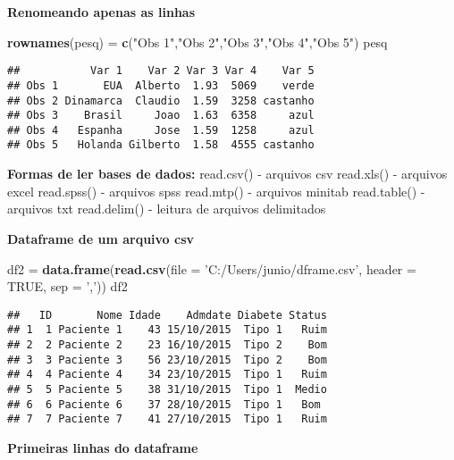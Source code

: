 \documentclass[]{article}
\newenvironment{Shaded}{\begin{snugshade}}{\end{snugshade}}
\newcommand{\KeywordTok}[1]{\textcolor[rgb]{0.13,0.29,0.53}{\textbf{#1}}}
\newcommand{\DataTypeTok}[1]{\textcolor[rgb]{0.13,0.29,0.53}{#1}}
\newcommand{\StringTok}[1]{\textcolor[rgb]{0.31,0.60,0.02}{#1}}
\newcommand{\OtherTok}[1]{\textcolor[rgb]{0.56,0.35,0.01}{#1}}
\newcommand{\NormalTok}[1]{#1}
\begin{document}
\textbf{Renomeando apenas as linhas}

\begin{Shaded}
\begin{Highlighting}[]
\KeywordTok{rownames}\NormalTok{(pesq) =}\StringTok{ }\KeywordTok{c}\NormalTok{(}\StringTok{"Obs 1"}\NormalTok{,}\StringTok{"Obs 2"}\NormalTok{,}\StringTok{"Obs 3"}\NormalTok{,}\StringTok{"Obs 4"}\NormalTok{,}\StringTok{"Obs 5"}\NormalTok{) }
\NormalTok{pesq}
\end{Highlighting}
\end{Shaded}

\begin{verbatim}
##           Var 1    Var 2 Var 3 Var 4    Var 5
## Obs 1       EUA  Alberto  1.93  5069    verde
## Obs 2 Dinamarca  Claudio  1.59  3258 castanho
## Obs 3    Brasil     Joao  1.63  6358     azul
## Obs 4   Espanha     Jose  1.59  1258     azul
## Obs 5   Holanda Gilberto  1.58  4555 castanho
\end{verbatim}

\textbf{Formas de ler bases de dados:} read.csv() - arquivos csv
read.xls() - arquivos excel read.spss() - arquivos spss read.mtp() -
arquivos minitab read.table() - arquivos txt read.delim() - leitura de
arquivos delimitados

\textbf{Dataframe de um arquivo csv}

\begin{Shaded}
\begin{Highlighting}[]
\NormalTok{df2 =}\StringTok{ }\KeywordTok{data.frame}\NormalTok{(}\KeywordTok{read.csv}\NormalTok{(}\DataTypeTok{file =} \StringTok{'C:/Users/junio/dframe.csv'}\NormalTok{,}
                          \DataTypeTok{header =} \OtherTok{TRUE}\NormalTok{, }\DataTypeTok{sep =} \StringTok{','}\NormalTok{))}
\NormalTok{df2}
\end{Highlighting}
\end{Shaded}

\begin{verbatim}
##   ID       Nome Idade    Admdate Diabete Status
## 1  1 Paciente 1    43 15/10/2015  Tipo 1   Ruim
## 2  2 Paciente 2    23 16/10/2015  Tipo 2    Bom
## 3  3 Paciente 3    56 23/10/2015  Tipo 2    Bom
## 4  4 Paciente 4    34 23/10/2015  Tipo 1   Ruim
## 5  5 Paciente 5    38 31/10/2015  Tipo 1  Medio
## 6  6 Paciente 6    37 28/10/2015  Tipo 1   Bom 
## 7  7 Paciente 7    41 27/10/2015  Tipo 1   Ruim
\end{verbatim}

\textbf{Primeiras linhas do dataframe}
\end{document}
